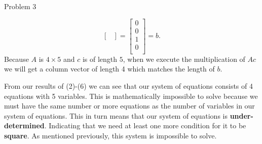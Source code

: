 \begin{problem}{Problem 3}
\begin{Highlight}[Solution]
\begin{equation}
\begin{bmatrix}
            \end{bmatrix}
            = 
            \begin{bmatrix}
                0 \\
                0 \\
                1 \\
                0 \\
            \end{bmatrix}
            = b.
        \end{equation}
        Because $A$ is $4 \times 5$ and $c$ is of length $5$, when we execute the multiplication of $Ac$ we will get a column vector of length 4 which matches the length of $b$.

        From our results of (2)-(6) we can see that our system of equations consists of 4 equations with 5 variables. This is mathematically impossible to solve because we must have the same number or 
        more equations as the number of variables in our system of equations. This in turn means that our system of equations is \textbf{under-determined}. Indicating that we need at least one more 
        condition for it to be \textbf{square}. As mentioned previously, this system is impossible to solve.
    \end{Highlight}
\end{problem}

